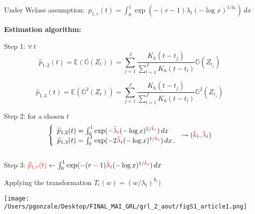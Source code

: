 \documentclass[9pt,compress]{beamer}
\begin{document}
\begin{frame}{Under Wclass assumption: $\,p_{1,r}(t)=\int_0^1\exp(-(r-1)\lambda_t(-\log x)^{1/k_t})\,dx$}
    
  
    
    \textbf{Estimation algorithm:}\\
    \bigskip
    
    Step 1\footnotemark[12]: $\forall \,t$\\
    
    $$ \widehat{p}_{1,2}(t)= \mathbb{E} (\mathbb{G}(Z_{t})) = \sum_{j=1}^J
    \frac{K_h(t-t_j)}{\sum_{l=1}^J K_h(t-t_l)}\mathbb{G}(Z_{t_j})$$
     
    $$\widehat{p}_{1,3}(t)= \mathbb{E} (\mathbb{G}^2(Z_{t})) =\sum_{j=1}^J
    \frac{K_h(t-t_j)}{\sum_{l=1}^J K_h(t-t_l)}\mathbb{G}^{2}(Z_{t_j})$$
    
    Step 2: for a chosen $t$
    \begin{equation*}
    \left\lbrace
    \begin{array}{l}
    \widehat{p}_{1,2}(t)=\int_0^1\exp(-\color{purple}\hat{\lambda}_t\color{black}(-\log x)^{1/\color{purple}\hat{k}_t\color{black}})\,dx\\
    \widehat{p}_{1,3}(t)=\int_0^1\exp(-2\color{purple}\hat{\lambda}_t\color{black}(-\log x)^{1/\color{purple}\hat{k}_t\color{black}})\,dx\,.
    \end{array}
    \right.\rightsquigarrow (\color{purple}\hat{k}_t\color{black},\color{purple}\hat{\lambda}_t\color{black})\end{equation*} \\
    \bigskip
    Step 3:\qquad
    ${\color{red}\widehat{p}_{1,r}(t)} \leftarrow\int_0^1\exp(-(r-1)\color{purple}\hat{\lambda}_t\color{black}(-\log x)^{1/\color{purple}\hat{k}_t\color{black}})\,dx$\\
    \end{frame}
%
%
%
\begin{frame}{Applying the transformation $T_t(w)=(w/\lambda_t)^{k_t})$ }
\begin{center}
\texttt{[image: /Users/pgonzale/Desktop/FINAL\_MAI\_GRL/grl\_2\_aout/figS1\_article1.png]}
 \end{center}    
 \end{frame}
%
%
%
\end{document}
